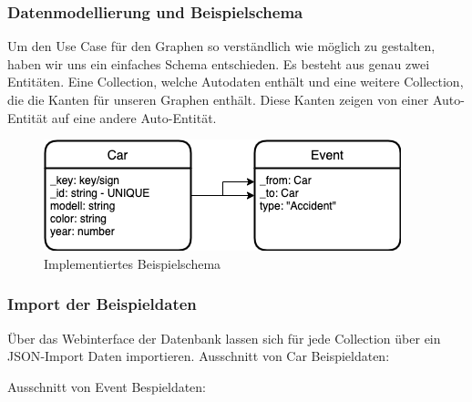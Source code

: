 \subsubsection{Datenmodellierung und Beispielschema}
Um den Use Case für den Graphen so verständlich wie möglich zu gestalten, haben wir uns ein einfaches Schema entschieden. Es besteht aus genau zwei Entitäten. Eine Collection, welche Autodaten enthält und eine weitere Collection, die die Kanten für unseren Graphen enthält. Diese Kanten zeigen von einer Auto-Entität auf eine andere Auto-Entität.
\begin{figure}[htbp] 
  	\centering
     \includegraphics[width=.7\textwidth]{./images/Schema.png}
 	\caption{Implementiertes Beispielschema}
  \label{fig:DataSchema}
\end{figure}
\subsubsection{Import der Beispieldaten}
Über das Webinterface der Datenbank lassen sich für jede Collection über ein \ac{JSON}-Import Daten importieren.
Ausschnitt von Car Beispieldaten:

Ausschnitt von Event Bespieldaten:

